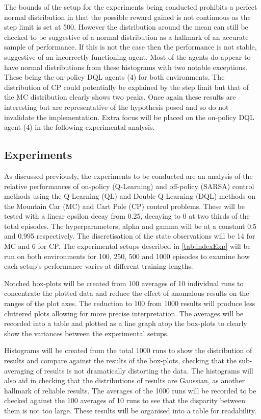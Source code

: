 \documentclass[hidelinks,journal]{IEEEtran}
\begin{document}
The bounds of the setup for the experiments being conducted prohibits a perfect normal distribution in that the possible reward gained is not continuous as the step limit is set at 500. However the distribution around the mean can still be checked to be suggestive of a normal distribution as a hallmark of an accurate sample of performance. If this is not the case then the performance is not stable, suggestive of an incorrectly functioning agent. Most of the agents do appear to have normal distributions from these histograms with two notable exceptions. These being the on-policy DQL agents (4) for both environments. The distribution of CP could potentially be explained by the step limit but that of the MC distribution clearly shows two peaks. Once again these results are interesting but are representative of the hypothesis posed and so do not invalidate the implementation. Extra focus will be placed on the on-policy DQL agent (4) in the following experimental analysis.
\subsection{Experiments}
\label{subsec:expExp}
As discussed previously, the experiments to be conducted are an analysis of the relative performances  of on-policy (Q-Learning) and off-policy (SARSA) control methods using the Q-Learning (QL) and Double Q-Learning (DQL) methods on the Mountain Car (MC) and Cart Pole (CP) control problems. These will be tested with a linear epsilon decay from 0.25, decaying to 0 at two thirds of the total episodes. The hyperparameters, alpha and gamma will be at a constant 0.5 and 0.995 respectively. The discretisation of the state observations will be 14 for MC and 6 for CP. The experimental setups described in \ref{tab:indexExp} will be run on both environments for 100, 250, 500 and 1000 episodes to examine how each setup’s performance varies at different training lengths.

Notched box-plots will be created from 100 averages of 10 individual runs to concentrate the plotted data and reduce the effect of anomalous results on the ranges of the plot axes. The reduction to 100 from 1000 results will produce less cluttered plots allowing for more precise interpretation. The averages will be recorded into a table and plotted as a line graph atop the box-plots to clearly show the variances between the experimental setups.

Histograms will be created from the total 1000 runs to show the distribution of results and compare against the results of the box-plots, checking that the sub-averaging of results is not dramatically distorting the data. The histograms will also aid in checking that the distributions of results are Gaussian, as another hallmark of reliable results. The averages of the 1000 runs will be recorded to be checked against the 100 averages of 10 runs to see that the disparity between them is not too large. These results will be organised into a table for readability.
\end{document}
